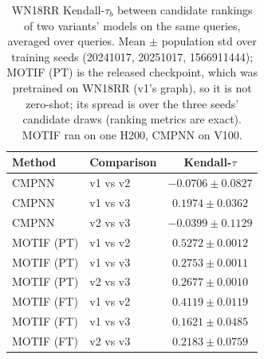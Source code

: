 \begin{table}[t]
\centering
\small
\begin{tabular}{||l||l||c||}
\hline
\textbf{Method} & \textbf{Comparison} & \textbf{Kendall-$\tau$} \\
\hline\hline
CMPNN & v1 vs v2 & $-0.0706 \pm 0.0827$ \\
\hline
CMPNN & v1 vs v3 & $0.1974 \pm 0.0362$ \\
\hline
CMPNN & v2 vs v3 & $-0.0399 \pm 0.1129$ \\
\hline
\hline
MOTIF (PT) & v1 vs v2 & $0.5272 \pm 0.0012$ \\
\hline
MOTIF (PT) & v1 vs v3 & $0.2753 \pm 0.0011$ \\
\hline
MOTIF (PT) & v2 vs v3 & $0.2677 \pm 0.0010$ \\
\hline
\hline
MOTIF (FT) & v1 vs v2 & $0.4119 \pm 0.0119$ \\
\hline
MOTIF (FT) & v1 vs v3 & $0.1621 \pm 0.0485$ \\
\hline
MOTIF (FT) & v2 vs v3 & $0.2183 \pm 0.0759$ \\
\hline
\end{tabular}
\caption{WN18RR Kendall-$\tau_b$ between candidate rankings of two variants' models on the same queries, averaged over queries. Mean $\pm$ population std over training seeds (20241017, 20251017, 1566911444); MOTIF (PT) is the released checkpoint, which was pretrained on WN18RR (v1's graph), so it is not zero-shot; its spread is over the three seeds' candidate draws (ranking metrics are exact). MOTIF ran on one H200, CMPNN on V100. }
\label{tab:wordnet_link_prediction_seed_invariance}
\end{table}
